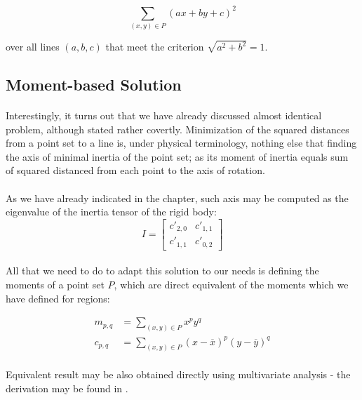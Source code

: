 \[
	\sum_{(x,y) \in P} (ax + by + c)^2
\]

over all lines $(a,b,c)$ that meet the criterion $\sqrt{a^2 + b^2} = 1$.

\subsection{Moment-based Solution}

\paragraph*{}
Interestingly, it turns out that we have already discussed almost identical problem, although stated rather covertly. Minimization of the squared distances from a point set to a line is, under physical terminology, nothing else that finding the axis of minimal inertia of the point set; as its moment of inertia equals sum of squared distanced from each point to the axis of rotation.

\paragraph*{}
As we have already indicated in the  chapter, such axis may be computed as the eigenvalue of the inertia tensor of the rigid body:
\[
I = \begin{bmatrix}
c'_{2,0} & c'_{1,1}\\
c'_{1,1} & c'_{0,2}
\end{bmatrix}
\]

\paragraph*{}
All that we need to do to adapt this solution to our needs is defining the moments of a point set $P$, which are direct equivalent of the moments which we have defined for regions:

\begin{align*}
	m_{p,q} &= \sum_{(x,y) \in P} {x}^p {y}^q \\
	c_{p,q} &= \sum_{(x,y) \in P} ({x}-\overline{x})^p ({y}-\overline{y})^q
\end{align*}

\paragraph*{}
Equivalent result may be also obtained directly using multivariate analysis - the derivation may be found in \cite[p.~588-591]{Haralick92}.

